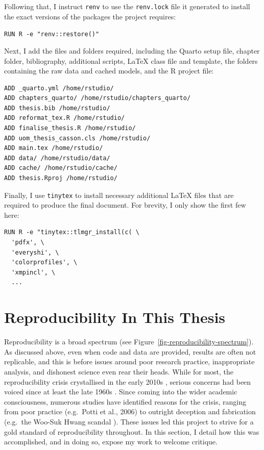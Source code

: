 \documentclass[../main.tex]{subfiles}
\begin{document}
Following that, I instruct \texttt{renv} to use the \texttt{renv.lock}
file it generated to install the exact versions of the packages the
project requires:

\texttt{RUN\ R\ -e\ "renv::restore()"}

Next, I add the files and folders required, including the Quarto setup
file, chapter folder, bibliography, additional scripts, LaTeX class file
and template, the folders containing the raw data and cached models, and
the R project file:

\begin{verbatim}
ADD _quarto.yml /home/rstudio/
ADD chapters_quarto/ /home/rstudio/chapters_quarto/
ADD thesis.bib /home/rstudio/
ADD reformat_tex.R /home/rstudio/
ADD finalise_thesis.R /home/rstudio/
ADD uom_thesis_casson.cls /home/rstudio/
ADD main.tex /home/rstudio/
ADD data/ /home/rstudio/data/
ADD cache/ /home/rstudio/cache/
ADD thesis.Rproj /home/rstudio/
\end{verbatim}

Finally, I use \texttt{tinytex} to install necessary additional LaTeX
files that are required to produce the final document. For brevity, I
only show the first few here:

\begin{verbatim}
RUN R -e "tinytex::tlmgr_install(c( \
  'pdfx', \
  'everyshi', \
  'colorprofiles', \
  'xmpincl', \
  ...
\end{verbatim}

\section{Reproducibility In This
Thesis}\label{reproducibility-in-this-thesis}

Reproducibility is a broad spectrum \cite{peng_2011} (see
Figure~\ref{fig-reproducibility-spectrum}). As discussed above, even
when code and data are provided, results are often not replicable, and
this is before issues around poor research practice, inappropriate
analysis, and dishonest science even rear their heads. While for most,
the reproducibility crisis \cite{osf_2015} crystallised in the early
2010s \cite{peng_2015}, serious concerns had been voiced since at least
the late 1960s \cite{romero_2019}. Since coming into the wider academic
consciousness, numerous studies have identified reasons for the crisis,
ranging from poor practice (e.g.~Potti et al., 2006) to outright
deception and fabrication (e.g.~the Woo-Suk Hwang scandal
\cite{saunders_2008}). These issues led this project to strive for a
gold standard \cite{peng_2011} of reproducibility throughout. In this
section, I detail how this was accomplished, and in doing so, expose my
work to welcome critique.
\end{document}
